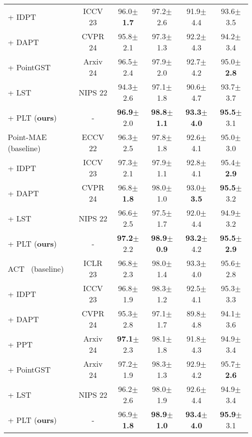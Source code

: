 \begin{table}[!t]
\begin{tabular}{lccccc}
   + IDPT~\cite{zha2023instance} & ICCV 23    & 96.0$\pm$\textbf{1.7}& 97.2$\pm$2.6& 91.9$\pm$4.4& 93.6$\pm$3.5\\
   + DAPT~\cite{zhou2024dynamic} & CVPR 24&95.8$\pm$2.1 &97.3$\pm$1.3 &92.2$\pm$4.3 &94.2$\pm$3.4 \\
   + PointGST~\cite{liang2024parameter}  & Arxiv 24&96.5$\pm$2.4 &97.9$\pm$2.0 &92.7$\pm$4.2 &95.0$\pm$\textbf{2.8} \\
   + LST~\cite{sung2022lst}  & NIPS 22&94.3$\pm$2.6 &97.1$\pm$1.8 &90.6$\pm$4.7 &93.7$\pm$3.7 \\
   \rowcolor{linecolor!40}+ PLT (\textbf{ours}) & -&\textbf{96.9}$\pm$2.0 &\textbf{98.8}$\pm$\textbf{1.1}&\textbf{93.3}$\pm$\textbf{4.0} &\textbf{95.5}$\pm$3.1 \\
    \midrule
    Point-MAE~\cite{pang2022masked} (baseline) &ECCV 22 & 96.3$\pm$2.5 & 97.8$\pm$1.8 & 92.6$\pm$4.1 & 95.0$\pm$3.0\\
   + IDPT~\cite{zha2023instance} &   ICCV 23    & 97.3$\pm$2.1& 97.9$\pm$1.1& 92.8$\pm$4.1& 95.4$\pm$\textbf{2.9}\\
   + DAPT~\cite{zhou2024dynamic} & CVPR 24 & 96.8$\pm$\textbf{1.8}  &  98.0$\pm$1.0 & 93.0$\pm$\textbf{3.5} & \textbf{95.5}$\pm$3.2  \\
   + LST~\cite{sung2022lst}  & NIPS 22&96.6$\pm$2.5 &97.5$\pm$1.7 &92.0$\pm$4.4 &94.9$\pm$3.2 \\
   \rowcolor{linecolor!40}+ PLT (\textbf{ours}) & - & \textbf{97.2}$\pm$2.2  &  \textbf{98.9}$\pm$\textbf{0.9} & \textbf{93.2}$\pm$4.2 & \textbf{95.5}$\pm$\textbf{2.9}  \\
   \midrule
   ACT~\cite{dong2022autoencoders} (baseline) & ICLR 23 & 96.8$\pm$2.3 & 98.0$\pm$1.4 & 93.3$\pm$4.0 & 95.6$\pm$2.8\\
   + IDPT~\cite{zha2023instance} &   ICCV 23    & 96.8$\pm$1.9& 98.3$\pm$1.2& 92.5$\pm$4.1& 95.3$\pm$3.3\\
   + DAPT~\cite{zhou2024dynamic} & CVPR 24 & 95.3$\pm$2.8  &  97.1$\pm$1.7 & 89.8$\pm$4.8 & 94.1$\pm$3.6  \\
   + PPT~\cite{zhang2024positional}  & Arxiv 24 & \textbf{97.1}$\pm$2.3 &98.1$\pm$1.8 &91.8$\pm$4.3 &94.9$\pm$3.4 \\
   + PointGST~\cite{liang2024parameter} & Arxiv 24 & 97.2$\pm$1.9  &  98.3$\pm$1.3 & 92.9$\pm$4.2 & 95.7$\pm$\textbf{2.6}  \\
   + LST~\cite{sung2022lst}  & NIPS 22&96.2$\pm$2.6 &98.0$\pm$1.9 &92.6$\pm$4.4 &94.9$\pm$3.4 \\
   \rowcolor{linecolor!40}+ PLT (\textbf{ours}) & - & 96.9$\pm$\textbf{1.8}  &  \textbf{98.9}$\pm$\textbf{1.0} & \textbf{93.4}$\pm$\textbf{4.0} & \textbf{95.9}$\pm$3.1  \\
    \bottomrule
    \end{tabular}%
  \label{tab:fewshot}%
\end{table}%